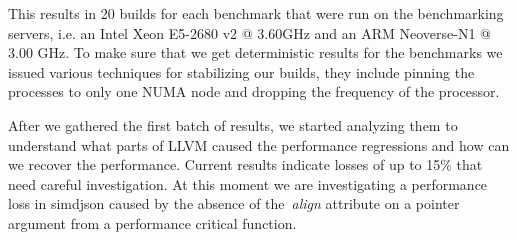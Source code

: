 This results in 20 builds for each benchmark that were run on the benchmarking
servers, i.e. an Intel Xeon E5-2680 v2 @ 3.60GHz and an ARM Neoverse-N1 @ 3.00
GHz. To make sure that we get deterministic results for the benchmarks we issued
various techniques for stabilizing our builds, they include pinning the processes
to only one NUMA node and dropping the frequency of the processor.

After we gathered the first batch of results, we started analyzing them to
understand what parts of LLVM caused the performance regressions and how can we
recover the performance. Current results indicate losses of up to 15\% that
need careful investigation. At this moment we are investigating a performance
loss in simdjson caused by the absence of the~\textit{align} attribute on a
pointer argument from a performance critical function.
